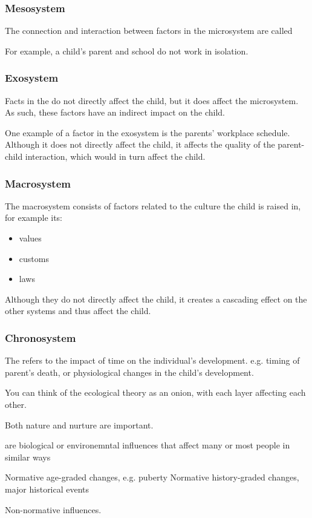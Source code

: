 \documentclass[../main/main.tex]{subfiles}
\begin{document}
\subsubsection{Mesosystem}
The connection and interaction between factors in the microsystem are called

For example, a child's parent and school do not work in isolation.
\subsubsection{Exosystem}
Facts in the  do not directly affect the child, but it does affect the microsystem. As such, these factors have an indirect impact on the child.
\begin{example}
One example of a factor in the exosystem is the parents' workplace schedule. Although it does not directly affect the child, it affects the quality of the  parent-child interaction, which would in turn affect the child.
\end{example}

\subsubsection{Macrosystem}
The macrosystem consists of factors related to the culture the child is raised in, for example its:
\begin{itemize}
\item values
\item customs
\item laws
\end{itemize}
Although they do not directly affect the child, it creates a cascading effect on the other systems and thus affect the child.
\subsubsection{Chronosystem}
The  refers to the impact of time on the individual's development.
e.g. timing of parent's death, or physiological changes in the child's development.

\begin{remark}
You can think of the ecological theory as an onion, with each layer affecting each other.
\end{remark}


Both nature and nurture are important.

\begin{definition}
 are biological or environemntal influences that affect many or most people in similar ways
\end{definition}
Normative age-graded changes, e.g. puberty
Normative history-graded changes, major historical events

Non-normative influences.
\end{document}
